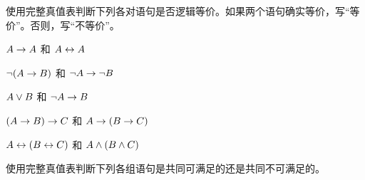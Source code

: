 \problempart
\label{pr.TT.equiv2}
使用完整真值表判断下列各对语句是否逻辑等价。如果两个语句确实等价，写“等价”。否则，写“不等价”。


\begin{compactlist}
\item $A\rightarrow A$ 和 $A \leftrightarrow A$
\item $\neg(A \rightarrow B)$ 和 $\neg A \rightarrow \neg B$
\item $A \vee B$ 和 $\neg A \rightarrow B$
\item$(A \rightarrow B) \rightarrow C$ 和 $A \rightarrow (B \rightarrow C)$
\item $A \leftrightarrow (B \leftrightarrow C)$ 和 $A \wedge (B \wedge C)$
\end{compactlist}

\problempart
\label{pr.TT.satisfiable2}
使用完整真值表判断下列各组语句是共同可满足的还是共同不可满足的。


